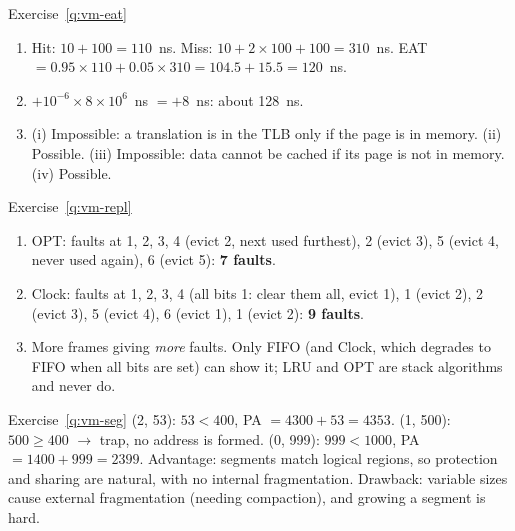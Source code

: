 \begin{noot}{Exercise~\ref{q:vm-eat}}
\begin{enumerate}[label=(\alph*),leftmargin=*]
  \item Hit: $10+100=110$~ns. Miss: $10+2\times100+100=310$~ns.
  EAT $=0.95\times110+0.05\times310=104.5+15.5=120$~ns.
  \item $+10^{-6}\times8\times10^6$~ns $=+8$~ns: about 128~ns.
  \item (i) Impossible: a translation is in the TLB only if the page is in memory.
  (ii) Possible. (iii) Impossible: data cannot be cached if its page is not in
  memory. (iv) Possible.
\end{enumerate}
\end{noot}

\begin{noot}{Exercise~\ref{q:vm-repl}}
\begin{enumerate}[label=(\alph*),leftmargin=*]
  \item OPT: faults at 1, 2, 3, 4 (evict 2, next used furthest), 2 (evict 3), 5
  (evict 4, never used again), 6 (evict 5): \textbf{7 faults}.
  \item Clock: faults at 1, 2, 3, 4 (all bits 1: clear them all, evict 1), 1 (evict
  2), 2 (evict 3), 5 (evict 4), 6 (evict 1), 1 (evict 2): \textbf{9 faults}.
  \item More frames giving \emph{more} faults. Only FIFO (and Clock, which degrades
  to FIFO when all bits are set) can show it; LRU and OPT are stack algorithms and
  never do.
\end{enumerate}
\end{noot}

\begin{noot}{Exercise~\ref{q:vm-seg}}
(2, 53): $53<400$, PA $=4300+53=4353$. (1, 500): $500\ge400$ $\to$ trap, no address
is formed. (0, 999): $999<1000$, PA $=1400+999=2399$. Advantage: segments match
logical regions, so protection and sharing are natural, with no internal
fragmentation. Drawback: variable sizes cause external fragmentation (needing
compaction), and growing a segment is hard.
\end{noot}

